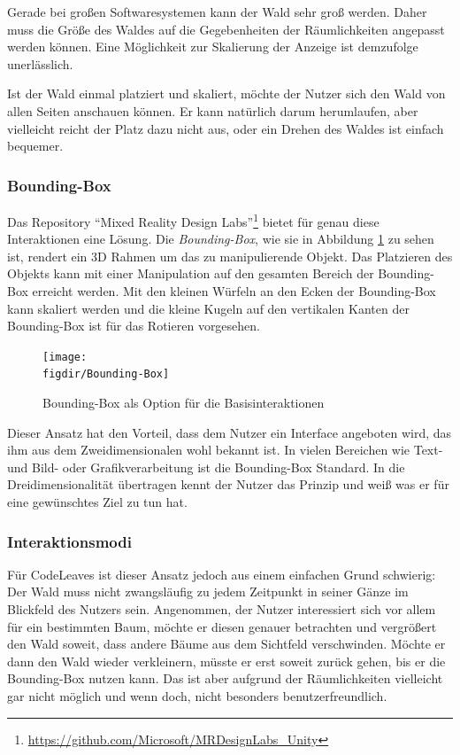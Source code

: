 Gerade bei großen Softwaresystemen kann der Wald sehr groß werden. Daher muss die Größe des Waldes auf die Gegebenheiten der Räumlichkeiten angepasst werden können. Eine Möglichkeit zur Skalierung der Anzeige ist demzufolge unerlässlich.

Ist der Wald einmal platziert und skaliert, möchte der Nutzer sich den Wald von allen Seiten anschauen können. Er kann natürlich darum herumlaufen, aber vielleicht reicht der Platz dazu nicht aus, oder ein Drehen des Waldes ist einfach bequemer.

\subsubsection*{Bounding-Box}

Das Repository "`Mixed Reality Design Labs"'\footnote{\url{https://github.com/Microsoft/MRDesignLabs_Unity}} bietet für genau diese Interaktionen eine Lösung. Die \textit{Bounding-Box}, wie sie in Abbildung \ref{fig:Bounding-Box} zu sehen ist, rendert ein 3D Rahmen um das zu manipulierende Objekt. Das Platzieren des Objekts kann mit einer Manipulation auf den gesamten Bereich der Bounding-Box erreicht werden. Mit den kleinen Würfeln an den Ecken der Bounding-Box kann skaliert werden und die kleine Kugeln auf den vertikalen Kanten der Bounding-Box ist für das Rotieren vorgesehen.

\begin{figure}[htb]
  \texttt{[image: \\figdir/Bounding-Box]}
  \caption{Bounding-Box als Option für die Basisinteraktionen \cite{microsoft2017mixed}}
  \label{fig:Bounding-Box}
\end{figure}

Dieser Ansatz hat den Vorteil, dass dem Nutzer ein Interface angeboten wird, das ihm aus dem Zweidimensionalen wohl bekannt ist. In vielen Bereichen wie Text- und Bild- oder Grafikverarbeitung ist die Bounding-Box Standard. In die Dreidimensionalität übertragen kennt der Nutzer das Prinzip und weiß was er für eine gewünschtes Ziel zu tun hat.

\subsubsection*{Interaktionsmodi}

Für CodeLeaves ist dieser Ansatz jedoch aus einem einfachen Grund schwierig: Der Wald muss nicht zwangsläufig zu jedem Zeitpunkt in seiner Gänze im Blickfeld des Nutzers sein. Angenommen, der Nutzer interessiert sich vor allem für ein bestimmten Baum, möchte er diesen genauer betrachten und vergrößert den Wald soweit, dass andere Bäume aus dem Sichtfeld verschwinden. Möchte er dann den Wald wieder verkleinern, müsste er erst soweit zurück gehen, bis er die Bounding-Box nutzen kann. Das ist aber aufgrund der Räumlichkeiten vielleicht gar nicht möglich und wenn doch, nicht besonders benutzerfreundlich.

